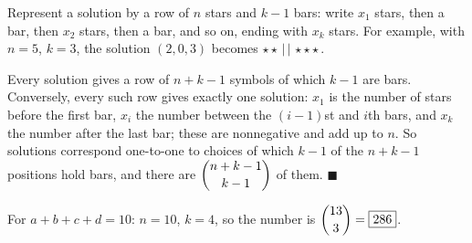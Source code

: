 Represent a solution by a row of $n$ stars and $k-1$ bars: write $x_1$ stars, then a bar, then $x_2$ stars, then a bar, and so on, ending with $x_k$ stars. For example, with $n=5$, $k=3$, the solution $(2,0,3)$ becomes $\star\star\,|\,|\,\star\star\star$.

Every solution gives a row of $n+k-1$ symbols of which $k-1$ are bars. Conversely, every such row gives exactly one solution: $x_1$ is the number of stars before the first bar, $x_i$ the number between the $(i-1)$st and $i$th bars, and $x_k$ the number after the last bar; these are nonnegative and add up to $n$. So solutions correspond one-to-one to choices of which $k-1$ of the $n+k-1$ positions hold bars, and there are $\dbinom{n+k-1}{k-1}$ of them. $\blacksquare$

For $a+b+c+d=10$: $n=10$, $k=4$, so the number is $\dbinom{13}{3}=\boxed{286}$.
